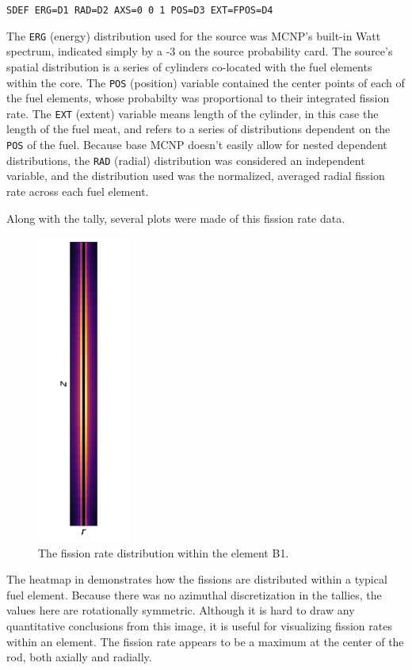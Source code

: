 \begin{center}
{\tt SDEF ERG=D1 RAD=D2  AXS=0 0 1  POS=D3  EXT=FPOS=D4}
\end{center}

The {\tt ERG} (energy) distribution used for the source was MCNP's built-in Watt spectrum, indicated simply by a -3 on the source probability card.
The source's spatial distribution is a series of cylinders co-located with the fuel elements within the core.
The {\tt POS} (position) variable contained the center points of each of the fuel elements, whose probabilty was proportional to their integrated fission rate.
The {\tt EXT} (extent) variable means length of the cylinder, in this case the length of the fuel meat, and refers to a series of distributions dependent on the {\tt POS} of the fuel.
Because base MCNP doesn't easily allow for nested dependent distributions, the {\tt RAD} (radial) distribution was considered an independent variable, and the distribution used was the normalized, averaged radial fission rate across each fuel element.

Along with the tally, several plots were made of this fission rate data.

\begin{figure}[htb]
\centering
\includegraphics[height=4in]{tex/figures/rr_dist_B1.png}
\caption[Fission Rate Dist. B1]{The fission rate distribution within the element B1.}
\label{fig:rr_dist_b1}
\end{figure}

The heatmap in  demonstrates how the fissions are distributed within a typical fuel element.
Because there was no azimuthal discretization in the tallies, the values here are rotationally symmetric.
Although it is hard to draw any quantitative conclusions from this image, it is useful for visualizing fission rates within an element.
The fission rate appears to be a maximum at the center of the rod, both axially and radially.

